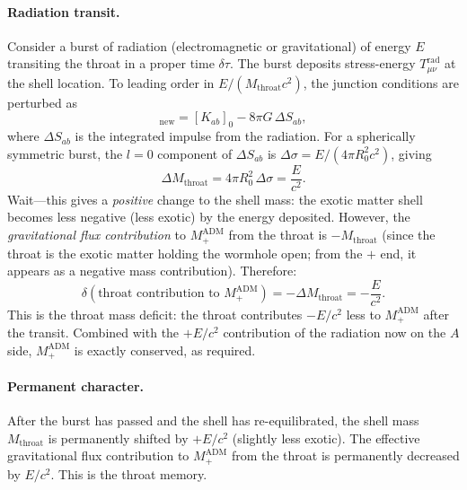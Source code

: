 \documentclass[aps,prd,onecolumn,nofootinbib,superscriptaddress]{revtex4-2}
\begin{document}
\paragraph{Radiation transit.}
Consider a burst of radiation (electromagnetic or gravitational) of energy $E$
transiting the throat in a proper time $\delta\tau$.  The burst deposits
stress-energy $T_{\mu\nu}^{\mathrm{rad}}$ at the shell location.  To leading
order in $E/(M_{\mathrm{throat}}c^2)$, the junction conditions are perturbed as
\begin{equation}
  [K_{ab}]_{\mathrm{new}}
  = [K_{ab}]_0 - 8\pi G\,\Delta S_{ab},
\end{equation}
where $\Delta S_{ab}$ is the integrated impulse from the radiation.  For a
spherically symmetric burst, the $l=0$ component of $\Delta S_{ab}$ is
$\Delta\sigma = E/(4\pi R_0^2 c^2)$, giving
\begin{equation}
  \Delta M_{\mathrm{throat}} = 4\pi R_0^2\,\Delta\sigma = \frac{E}{c^2}.
\end{equation}
Wait---this gives a \emph{positive} change to the shell mass: the exotic matter
shell becomes less negative (less exotic) by the energy deposited.  However,
the \emph{gravitational flux contribution} to $M_+^{\mathrm{ADM}}$ from the
throat is $-M_{\mathrm{throat}}$ (since the throat is the exotic matter
holding the wormhole open; from the $+$ end, it appears as a negative mass
contribution).  Therefore:
\begin{equation}
  \delta(\text{throat contribution to }M_+^{\mathrm{ADM}})
  = -\Delta M_{\mathrm{throat}} = -\frac{E}{c^2}.
\end{equation}
This is the throat mass deficit: the throat contributes $-E/c^2$ less to
$M_+^{\mathrm{ADM}}$ after the transit.  Combined with the $+E/c^2$
contribution of the radiation now on the $A$ side, $M_+^{\mathrm{ADM}}$
is exactly conserved, as required.

\paragraph{Permanent character.}
After the burst has passed and the shell has re-equilibrated, the shell mass
$M_{\mathrm{throat}}$ is permanently shifted by $+E/c^2$ (slightly less
exotic).  The effective gravitational flux contribution to $M_+^{\mathrm{ADM}}$
from the throat is permanently decreased by $E/c^2$.  This is the throat
memory.



\end{document}
